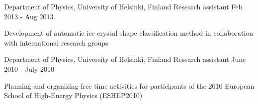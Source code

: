 \begin{cventries}
  \cventry
    {Department of Physics, University of Helsinki, Finland} %
    {Research assistant} %
    {} %
    {Feb 2013 - Aug 2013} %
    {
      \begin{cvitems} %
        \item {Development of automatic ice crystal shape classification method in collaboration with international research groups}
      \end{cvitems}
    }

  \cventry
    {Department of Physics, University of Helsinki, Finland} %
    {Research assistant} %
    {} %
    {June 2010 - July 2010} %
    {
      \begin{cvitems} %
        \item {Planning and organizing free time activities for participants of the 2010 European School of High-Energy Physics (ESHEP2010)}
      \end{cvitems}
}

\end{cventries}
